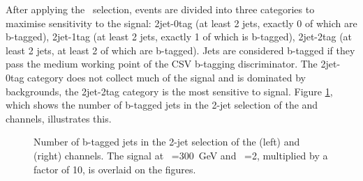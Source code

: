 After applying the \mT~selection, events are divided into three categories to maximise
sensitivity to the signal: 2jet-0tag (at least 2 jets, exactly 0 of which are b-tagged), 2jet-1tag 
(at least 2 jets, exactly 1 of which is b-tagged), 2jet-2tag (at least 2 jets, at least 2 of which are b-tagged).
Jets are considered b-tagged if they pass the medium working point of the \ac{CSV} b-tagging discriminator.
The 2jet-0tag category does not collect much of the signal and is dominated by 
backgrounds, the 2jet-2tag category is the most sensitive to signal. 
Figure \ref{fig:Hhh_selection_bjets}, which shows the number of b-tagged jets in the 2-jet selection of the \mutau and \etau
channels, illustrates this.

\begin{figure}[h!]
\begin{center}
\end{center}
\caption{Number of b-tagged jets in the 2-jet selection of the \mutau (left) and \etau (right) channels. The signal
at \mH~=$300$~GeV and \tanb~=2, multiplied by a factor of 10, is overlaid on the figures.}
\label{fig:Hhh_selection_bjets}
\end{figure} 


